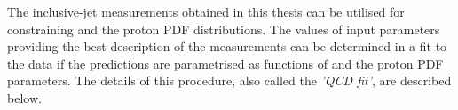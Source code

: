 The inclusive-jet measurements obtained in this thesis can be utilised for constraining \as and the proton PDF distributions. The values of input parameters providing the best description of the measurements can be determined in a fit to the data if the predictions are parametrised as functions of \asz and the proton PDF parameters. The details of this procedure, also called the \emph{'QCD fit'}, are described below.



